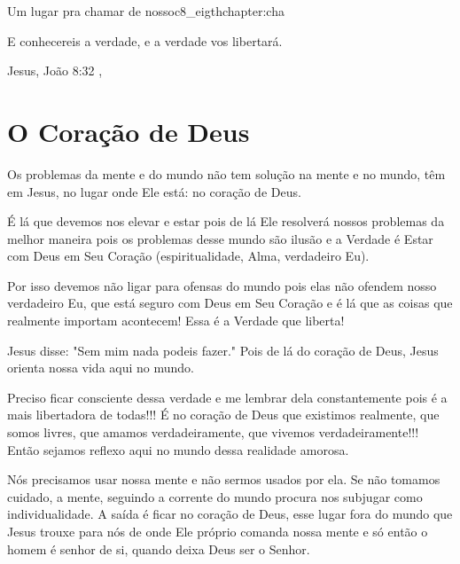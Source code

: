\begin{chapterpage}{Um lugar pra chamar de nosso}{c8_eigthchapter:cha}

\begin{myquotation} E conhecereis a verdade, e a verdade vos libertará.

\par\vspace*{15mm}
\mbox{}\hfill \emdash{}Jesus, João 8:32 
, %
\par\end{myquotation}

\end{chapterpage}



\section{O Coração de Deus}\label{c1_basicformatting:sec}

\emdash{}Os problemas da mente e do mundo não tem solução na mente e no mundo, têm em Jesus, no lugar onde Ele está: no coração de Deus.

\emdash{}É lá que devemos nos elevar e estar pois de lá Ele resolverá nossos problemas da melhor maneira pois os problemas desse mundo são ilusão e a Verdade é Estar com Deus em Seu Coração (espiritualidade, Alma, verdadeiro Eu).

\emdash{}Por isso devemos não ligar para ofensas do mundo pois elas não ofendem nosso verdadeiro Eu, que está seguro com Deus em Seu Coração e é lá que as coisas que realmente importam acontecem! Essa é a Verdade que liberta!

\emdash{}Jesus disse: "Sem mim nada podeis fazer." Pois de lá do coração de Deus, Jesus orienta nossa vida aqui no mundo. 

\emdash{}Preciso ficar consciente dessa verdade e me lembrar dela constantemente pois é a mais libertadora de todas!!! É no coração de Deus que existimos realmente, que somos livres, que amamos verdadeiramente, que vivemos verdadeiramente!!! Então sejamos reflexo aqui no mundo dessa realidade amorosa.

\emdash{}Nós precisamos usar nossa mente e não sermos usados por ela. Se não tomamos cuidado, a mente, seguindo a corrente do mundo procura nos subjugar como individualidade. A saída é ficar no coração de Deus, esse lugar fora do mundo que Jesus trouxe para nós de onde Ele próprio comanda nossa mente e só então o homem é senhor de si, quando deixa Deus ser o Senhor.
